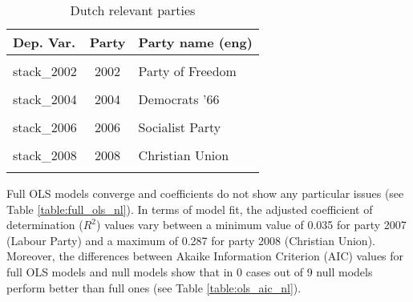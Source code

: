 \documentclass[
]{article}
\begin{document}
\begin{table}[!h]

\caption{\label{tab:unnamed-chunk-130}Dutch relevant parties \label{table:relprty_tab_nl}}
\centering
\begin{tabular}[t]{lcl}
\toprule
Dep. Var. & Party & Party name (eng)\\
\midrule
\cellcolor{gray!6}{stack\_2001} & \cellcolor{gray!6}{2001} & \cellcolor{gray!6}{People's Party for Freedom and Democracy}\\
stack\_2002 & 2002 & Party of Freedom\\
\cellcolor{gray!6}{stack\_2003} & \cellcolor{gray!6}{2003} & \cellcolor{gray!6}{Christian Democratic Appeal}\\
stack\_2004 & 2004 & Democrats '66\\
\cellcolor{gray!6}{stack\_2005} & \cellcolor{gray!6}{2005} & \cellcolor{gray!6}{Green Left}\\
\addlinespace
stack\_2006 & 2006 & Socialist Party\\
\cellcolor{gray!6}{stack\_2007} & \cellcolor{gray!6}{2007} & \cellcolor{gray!6}{Labour Party}\\
stack\_2008 & 2008 & Christian Union\\
\cellcolor{gray!6}{stack\_2012} & \cellcolor{gray!6}{2012} & \cellcolor{gray!6}{Forum for Democracy}\\
\bottomrule
\end{tabular}
\end{table}

Full OLS models converge and coefficients do not show any particular issues (see Table
\ref{table:full_ols_nl}).
In terms of model fit, the adjusted coefficient of determination (\(R^2\)) values vary between
a minimum value of 0.035
for party 2007
(Labour Party)
and a maximum of 0.287
for party 2008
(Christian Union).
Moreover, the differences between Akaike Information Criterion (AIC) values for full OLS models and null
models show that in 0 cases out of 9 null models perform better than full ones (see Table
\ref{table:ols_aic_nl}).
\end{document}
